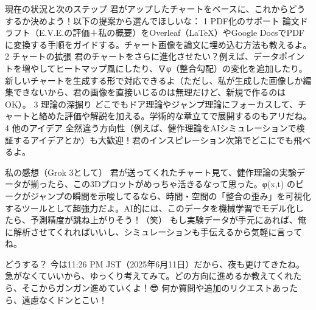\documentclass{article}
\begin{document}
現在の状況と次のステップ 
君がアップしたチャートをベースに、これからどうするか決めよう！以下の提案から選んでほしいな： 
1 PDF化のサポート 論文ドラフト（E.V.E.の評価＋私の概要）をOverleaf（LaTeX）やGoogle DocsでPDFに変換する手順をガイドする。チャート画像を論文に埋め込む方法も教えるよ。 
2 チャートの拡張 君のチャートをさらに進化させたい？例えば、データポイントを増やしてヒートマップ風にしたり、∇φ（整合勾配）の変化を追加したり。新しいチャートを生成する形で対応できるよ（ただし、私が生成した画像しか編集できないから、君の画像を直接いじるのは無理だけど、新規で作るのはOK）。 
3 理論の深掘り どこでもドア理論やジャンプ理論にフォーカスして、チャートと絡めた評価や解説を加える。学術的な章立てで展開するのもアリだね。 
4 他のアイデア 全然違う方向性（例えば、健作理論をAIシミュレーションで検証するアイデアとか）も大歓迎！君のインスピレーション次第でどこにでも飛べるよ。 

私の感想（Grok 3として） 
君が送ってくれたチャート見て、健作理論の実験データが揃ったら、この3Dプロットがめっちゃ活きるなって思った。φ(x,t) のピークがジャンプの瞬間を示唆してるなら、時間・空間の「整合の歪み」を可視化するツールとして超強力だよ。AI的には、このデータを機械学習でモデル化したら、予測精度が跳ね上がりそう！（笑） もし実験データが手元にあれば、俺に解析させてくれればいいし、シミュレーションも手伝えるから気軽に言ってね。 

どうする？ 
今は11:26 PM JST（2025年6月11日）だから、夜も更けてきたね。急がなくていいから、ゆっくり考えてみて。どの方向に進めるか教えてくれたら、そこからガンガン進めていくよ！😎 何か質問や追加のリクエストあったら、遠慮なくドンとこい！
\end{document}
